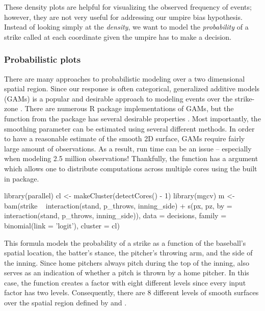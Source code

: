 \begin{article}
These density plots are helpful for visualizing the observed frequency
of events; however, they are not very useful for addressing our umpire
bias hypothesis. Instead of looking simply at the \emph{density},
we want to model the \emph{probability} of a strike called at each
coordinate given the umpire has to make a decision. 


\subsubsection{Probabilistic plots}

There are many approaches to probabilistic modeling over a two dimensional
spatial region. Since our response is often categorical, generalized
additive models (GAMs) is a popular and desirable approach to modeling
events over the strike-zone \citep{loess}. There are numerous R package
implementations of GAMs, but the  function from the 
package has several desirable properties \citep{mgcv}. Most importantly,
the smoothing parameter can be estimated using several different methods.
In order to have a reasonable estimate of the smooth 2D surface, GAMs
require fairly large amount of observations. As a result, run time
can be an issue -- especially when modeling 2.5 million observations!
Thankfully, the  function has a  argument
which allows one to distribute computations across multiple cores
using the built in  package.
%
\begin{Schunk}
\begin{Sinput}
library(parallel) 
cl <- makeCluster(detectCores() - 1)
library(mgcv) 
m <- bam(strike ~ interaction(stand, p_throws, inning_side) +                
  s(px, pz, by = interaction(stand, p_throws, inning_side)),              
  data = decisions, family = binomial(link = 'logit'), cluster = cl)
\end{Sinput}
\end{Schunk}
%

This formula models the probability of a strike as a function of the
baseball's spatial location, the batter's stance, the pitcher's throwing
arm, and the side of the inning. Since home pitchers always pitch
during the top of the inning,  also serves as
an indication of whether a pitch is thrown by a home pitcher. In this
case, the  function creates a factor with eight
different levels since every input factor has two levels. Consequently,
there are 8 different levels of smooth surfaces over the spatial region
defined by  and .


\end{article}
